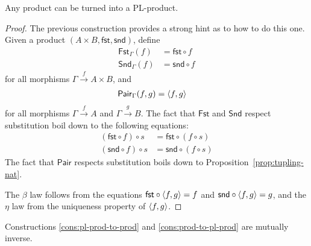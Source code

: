 \begin{construction} \label{cons:prod-to-pl-prod}
  Any product can be turned into a PL-product.
\end{construction}
\begin{proof}
  The previous construction provides a strong hint as to how to do this one.
  Given a product \((A\times B, \mathsf{fst}, \mathsf{snd})\), define
  \begin{align*}
    \mathsf{Fst}_\Gamma(f) &= \mathsf{fst} \circ f \\
    \mathsf{Snd}_\Gamma(f) &= \mathsf{snd} \circ f
  \end{align*}
  for all morphisms \(\Gamma \xrightarrow{f} A \times B\),
  and
  \begin{align*}
    \mathsf{Pair}_\Gamma(f,g) &= \langle f,g\rangle
  \end{align*}
  for all morphisms \(\Gamma\xrightarrow{f} A\) and \(\Gamma\xrightarrow{g} B\).
  The fact that \(\mathsf{Fst}\) and \(\mathsf{Snd}\) respect substitution boil down to the following equations:
  \begin{align*}
    (\mathsf{fst} \circ f) \circ s &= \mathsf{fst} \circ (f \circ s)  \\
    (\mathsf{snd} \circ f) \circ s &= \mathsf{snd} \circ (f \circ s)
  \end{align*}
  The fact that \(\mathsf{Pair}\) respects substitution boils down to Proposition~\ref{prop:tupling-nat}.

  The \(\beta\) law follows from the equations \(\mathsf{fst} \circ \langle f,g\rangle = f\)
  and \(\mathsf{snd} \circ \langle f,g\rangle = g\),
  and the \(\eta\) law from the uniqueness property of \(\langle f,g\rangle\).
\end{proof}

\begin{proposition}
 Constructions
 \ref{cons:pl-prod-to-prod}
 and
 \ref{cons:prod-to-pl-prod}
 are mutually inverse.
\end{proposition}



